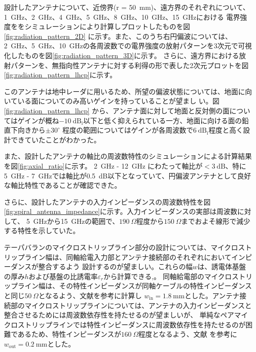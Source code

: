 \documentclass[11pt,a4paper,uplatex]{ujarticle}
\begin{document}
  設計したアンテナについて、近傍界(r = 50~mm)、遠方界のそれぞれについて、1~GHz、2~GHz、4~GHz、5~GHz、8~GHz、10~GHz、15~GHzにおける
  電界強度ををシミュレーションにより計算しプロットしたものを図\ref{fig:radiation_pattern_2D}
  に示す。また、このうち右円偏波については、2~GHz、5~GHz、10~GHzの各周波数での電界強度の放射パターンを3次元で可視化したものを図\ref{fig:radiation_pattern_3D}に示す。
  さらに、遠方界における放射パターンを、無指向性アンテナに対する利得の形で表した2次元プロットを図\ref{fig:radiation_pattern_lhcp}に示す。

  このアンテナは地中レーダに用いるため、所望の偏波状態については、地面に向いている面についてのみ高いゲインを持っていることが望まし
  い。図\ref{fig:radiation_pattern_lhcp}
  から、アンテナ面に対して地面と反対側の面についてはゲインが概ね$-10\mathrm{~dB_i}$以下と低く抑えられている一方、地面に向ける面の鉛直下向きから$\displaystyle \pm 30^{\circ}$
  程度の範囲についてはゲインが各周波数で$6\mathrm{~dB_i}$程度と高く設計できていたことがわかった。

  また、設計したアンテナの軸比の周波数特性のシミュレーションによる計算結果を図\ref{fig:axial_ratio}に示す。
  2~GHz - 12~GHz にわたって軸比が$<3\mathrm{~dB}$、特に5~GHz - 7~GHzでは軸比が0.5~dB以下となっていて、円偏波アンテナとして良好な軸比特性であることが確認できた。

  さらに、設計したアンテナの入力インピーダンスの周波数特性を図\ref{fig:spiral_antenna_impedance}に示す。入力インピーダンスの実部は周波数に対して、
  5~GHzから15~GHzの範囲で、$190~\Omega$程度から$150~\Omega$までおよそ線形で減少する特性を示していた。

  テーパバランのマイクロストリップライン部分の設計については、マイクロストリップライン幅は、同軸給電入力部とアンテナ接続部のそれぞれにおいてインピーダンスが整合するよう
  設計するのが望ましい。これらの幅$w$は、誘電体基盤の厚み$h$および基盤の比誘電率$\varepsilon_r$から計算できる\cite{ground_microstrip_line},\cite{pair_microstrip_line}。
  同軸給電部のマイクロストリップライン幅は、その特性インピーダンスが同軸ケーブルの特性インピーダンスと同じ$50~\Omega$となるよう、文献\cite{ground_microstrip_line}を参考に計算し
  $w_{\mathrm{in}} = 1.8\mathrm{~mm}$とした。アンテナ接続部のマイクロストリップラインについては、アンテナの入力インピーダンスと整合させるためには周波数依存性を持たせるのが望ましいが、
  単純なペアマイクロストリップラインでは特性インピーダンスに周波数依存性を持たせるのが困難であるため、特性インピーダンスが$160~\Omega$程度となるよう、文献\cite{pair_microstrip_line}
  を参考に$w_{\mathrm{out}} = 0.2\mathrm{~mm}$とした。
\end{document}
